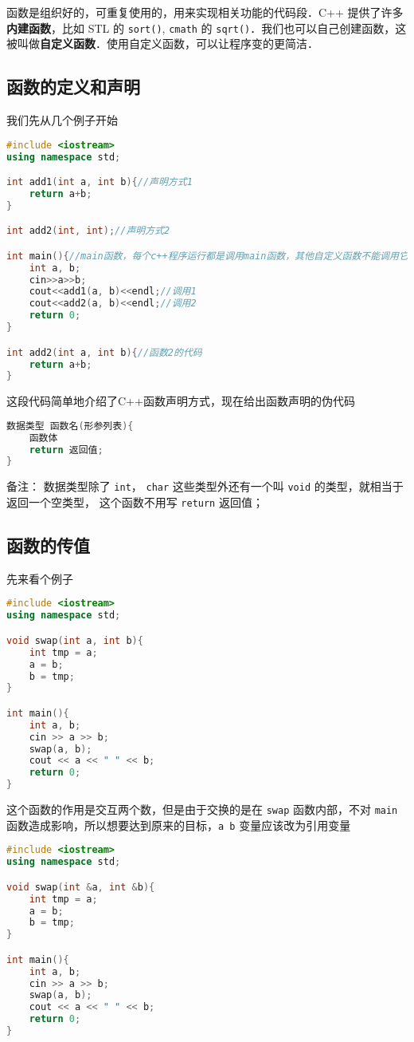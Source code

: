 
\begin{issues}
\issueDraft
\end{issues}

函数是组织好的，可重复使用的，用来实现相关功能的代码段．C++ 提供了许多\textbf{内建函数}，比如 STL 的 \verb|sort()|, \verb|cmath| 的 \verb|sqrt()|．我们也可以自己创建函数，这被叫做\textbf{自定义函数}．使用自定义函数，可以让程序变的更简洁．

\subsection{函数的定义和声明}
我们先从几个例子开始
\begin{lstlisting}[language=cpp]
#include <iostream>
using namespace std;

int add1(int a, int b){//声明方式1
    return a+b;
}

int add2(int, int);//声明方式2

int main(){//main函数，每个c++程序运行都是调用main函数，其他自定义函数不能调用它
    int a, b;
    cin>>a>>b;
    cout<<add1(a, b)<<endl;//调用1
    cout<<add2(a, b)<<endl;//调用2
    return 0;
}

int add2(int a, int b){//函数2的代码
    return a+b;
}
\end{lstlisting}
这段代码简单地介绍了C++函数声明方式，现在给出函数声明的伪代码
\begin{lstlisting}[language=cpp]
数据类型 函数名(形参列表){
    函数体
    return 返回值;
}
\end{lstlisting}
备注： 数据类型除了 \verb|int|， \verb|char| 这些类型外还有一个叫 \verb|void| 的类型，就相当于返回一个空类型， 这个函数不用写 \verb|return| 返回值；

\subsection{函数的传值}
先来看个例子
\begin{lstlisting}[language=cpp]
#include <iostream>
using namespace std;

void swap(int a, int b){
    int tmp = a;
    a = b;
    b = tmp;
}

int main(){
    int a, b;
    cin >> a >> b;
    swap(a, b);
    cout << a << " " << b;
    return 0;
}
\end{lstlisting}
这个函数的作用是交互两个数，但是由于交换的是在 \verb|swap| 函数内部，不对 \verb|main| 函数造成影响，所以想要达到原来的目标，\verb|a b| 变量应该改为引用变量
\begin{lstlisting}[language=cpp]
#include <iostream>
using namespace std;

void swap(int &a, int &b){
    int tmp = a;
    a = b;
    b = tmp;
}

int main(){
    int a, b;
    cin >> a >> b;
    swap(a, b);
    cout << a << " " << b;
    return 0;
}
\end{lstlisting}